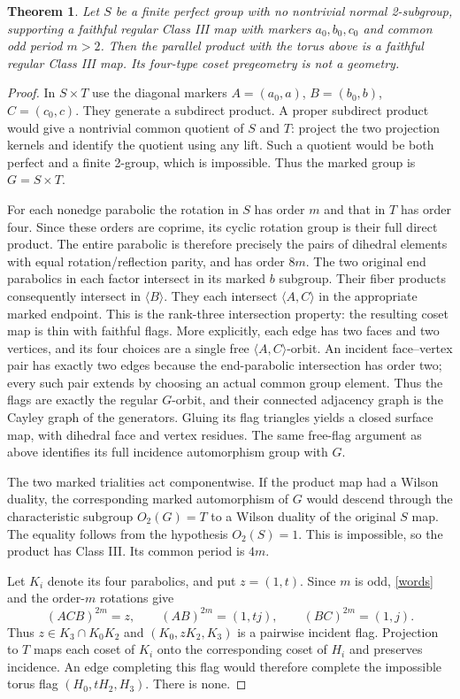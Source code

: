 \documentclass[11pt,a4paper]{article}
\newtheorem{theorem}{Theorem}\newtheorem{lemma}[theorem]{Lemma}\newtheorem{proposition}[theorem]{Proposition}
\newcommand{\gen}[1]{\langle#1\rangle}\newcommand{\F}{\mathbb F}\newcommand{\Aut}{\operatorname{Aut}}
\begin{document}
\begin{theorem}\label{parallel}
Let $S$ be a finite perfect group with no nontrivial normal
2-subgroup, supporting a faithful regular Class III map with
markers $a_0,b_0,c_0$ and common odd period $m>2$.
Then the parallel product with the torus above is a faithful regular
Class III map. Its four-type coset pregeometry is not a geometry.
\end{theorem}
\begin{proof}
In $S\times T$ use the diagonal markers
$A=(a_0,a)$, $B=(b_0,b)$, $C=(c_0,c)$. They generate a subdirect
product. A proper subdirect product would give a nontrivial common
quotient of $S$ and $T$: project the two projection kernels and
identify the quotient using any lift. Such a quotient would be both
perfect and a finite 2-group, which is impossible. Thus the marked
group is $G=S\times T$.

For each nonedge parabolic the rotation in $S$ has order $m$ and
that in $T$ has order four. Since these orders are coprime, its cyclic
rotation group is their full direct product. The entire parabolic is
therefore precisely the pairs of dihedral elements with equal
rotation/reflection parity, and has order $8m$. The two original
end parabolics in each factor intersect in its marked $b$ subgroup.
Their fiber products consequently intersect in $\gen B$.
They each intersect $\gen{A,C}$ in the appropriate marked endpoint.
This is the rank-three intersection property: the resulting coset
map is thin with faithful flags. More explicitly, each edge has
two faces and two vertices, and its four choices are a single free
$\gen{A,C}$-orbit. An incident face--vertex pair has exactly two
edges because the end-parabolic intersection has order two; every
such pair extends by choosing an actual common group element.
Thus the flags are exactly the regular $G$-orbit, and their connected
adjacency graph is the Cayley graph of the generators. Gluing its flag
triangles yields a closed surface map, with dihedral face and vertex
residues. The same free-flag argument as above identifies its full
incidence automorphism group with $G$.

The two marked trialities act componentwise. If the product map had
a Wilson duality, the corresponding marked automorphism of $G$
would descend through the characteristic subgroup $O_2(G)=T$ to
a Wilson duality of the original $S$ map. The equality follows from
the hypothesis $O_2(S)=1$. This is impossible, so the product has
Class III. Its common period is $4m$.

Let $K_i$ denote its four parabolics, and put $z=(1,t)$.
Since $m$ is odd, \eqref{words} and the order-$m$ rotations give
\[
 (ACB)^{2m}=z,\qquad
 (AB)^{2m}=(1,tj),\qquad (BC)^{2m}=(1,j).
\]
Thus $z\in K_3\cap K_0K_2$ and
$(K_0,zK_2,K_3)$ is a pairwise incident flag. Projection to $T$
maps each coset of $K_i$ onto the corresponding coset of $H_i$
and preserves incidence. An edge completing this flag would
therefore complete the impossible torus flag $(H_0,tH_2,H_3)$.
There is none.
\end{proof}
\end{document}
